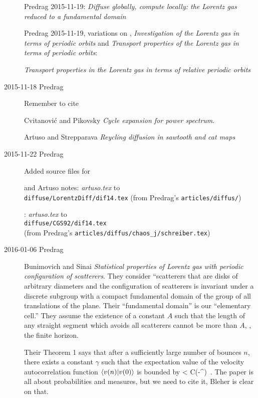 \begin{description}
Predrag 2015-11-19: {\em Diffuse globally, compute locally:
            the {Lorentz} gas reduced to a fundamental domain}

Predrag 2015-11-19, variations on ,
{\em Investigation of the Lorentz gas in terms of periodic orbits}
and
{\em Transport properties of the {Lorentz} gas
           in terms of periodic orbits}:

{\em Transport properties in the {Lorentz} gas
           in terms of relative periodic orbits}

\item[2015-11-18 Predrag]
Remember to cite

Cvitanovi\'c and
    Pikovsky {\em Cycle expansion for power spectrum}.

Artuso and Strepparava {\em Reycling diffusion in sawtooth and cat maps}


\item[2015-11-22 Predrag] Added source files for

and Artuso notes:
\emph{artuso.tex} to \\
\texttt{diffuse/LorentzDiff/dif14.tex}
(from Predrag's \texttt{articles/diffus/})

: \emph{artuso.tex} to \\
\texttt{diffuse/CGS92/dif14.tex}\\
(from Predrag's \texttt{articles/diffus/chaos\_j/schreiber.tex})

\item[2016-01-06 Predrag] Bunimovich and Sinai
{\em Statistical properties of {Lorentz} gas with periodic configuration
of scatterers}. They consider ``scatterers that are disks of arbitrary
diameters and the configuration of scatterers is invariant under a
discrete subgroup with a compact fundamental domain of the group of all
translations of the plane. Their ``fundamental domain'' is our
``elementary cell.'' They assume the existence of a constant $A$ such
that the length of any straight segment which avoids all scatterers
cannot be more than $A$, \ie, the finite horizon.

Their Theorem 1 says that after a sufficiently large number of bounces
$n$, there exists a constant $\gamma$ such that the expectation value
of the velocity autocorrelation function $\braket{v(n)}{v(0)}$ is
bounded by
\beq
    < C\exp(-\kappa \zeit^\gamma)
\,.
The paper is all about probabilities and measures,
but we need to cite it, Bleher is clear on that.


\end{description}
